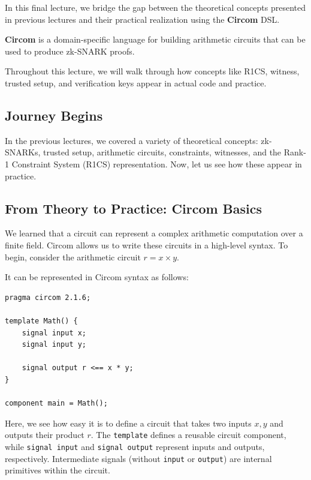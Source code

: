 \documentclass[../../book.tex]{subfiles}
\begin{document}
In this final lecture, we bridge the gap between the theoretical concepts presented in previous lectures and their practical realization using the \textbf{Circom} DSL.

\begin{definition}
    \textbf{Circom} is a domain-specific language for building arithmetic circuits that can be used to produce zk-SNARK proofs.
\end{definition}

Throughout this lecture, we will walk through how concepts like R1CS, witness, trusted setup, and verification keys appear in actual code and practice.

\subsection{Journey Begins}

In the previous lectures, we covered a variety of theoretical concepts: zk-SNARKs, trusted setup, arithmetic circuits, constraints, witnesses, and the Rank-1 Constraint System (R1CS) representation.
Now, let us see how these appear in practice.

\subsection{From Theory to Practice: Circom Basics}

We learned that a circuit can represent a complex arithmetic computation over a finite field.
Circom allows us to write these circuits in a high-level syntax.
To begin, consider the arithmetic circuit $r = x \times y$.

It can be represented in Circom syntax as follows:

\begin{lstlisting}[language=Circom]
pragma circom 2.1.6;

template Math() {
    signal input x;
    signal input y;

    signal output r <== x * y;
}

component main = Math();
\end{lstlisting}

Here, we see how easy it is to define a circuit that takes two inputs $x,y$ and outputs their product $r$.
The \texttt{template} defines a reusable circuit component, while \texttt{signal input} and \texttt{signal output} represent inputs and outputs, respectively.
Intermediate signals (without \texttt{input} or \texttt{output}) are internal primitives within the circuit.
\end{document}
